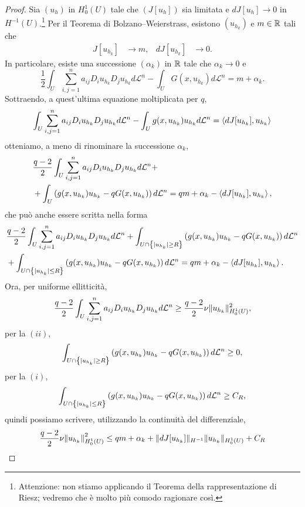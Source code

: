 \begin{proof}
Sia $(u_h)$ in $H^1_0(U)$ tale che $(J[u_h])$ sia limitata e $dJ[u_h] \to 0$ in $H^{-1}(U)$.\footnote{Attenzione: non stiamo applicando il Teorema della rappresentazione di Riesz; vedremo che è molto più comodo ragionare così.}
Per il Teorema di Bolzano--Weierstrass, esistono $(u_{h_k})$ e $m \in \mathbb{R}$ tali che 
\begin{align*}
	J[u_{h_k}] &\to m, & dJ[u_{h_k}] &\to 0.
\end{align*}
In particolare, esiste una successione $(\alpha_k)$ in $\mathbb{R}$ tale che $\alpha_k \to 0$ e
\[ \frac{1}{2} \int_U \sum_{i,j=1}^{n} a_{ij}D_iu_{h_k}D_ju_{h_k}d\mathcal{L}^n-\int_U G(x,u_{h_k}) d\mathcal{L}^n = m + \alpha_k.\]
Sottraendo, a quest'ultima equazione moltiplicata per $q$, 
\[ \int_U \sum_{i,j=1}^{n}a_{ij}D_iu_{h_k}D_ju_{h_k} d\mathcal{L}^n - \int_U g(x,u_{h_k})u_{h_k}d\mathcal{L}^n = \braket{dJ[u_{h_k}],u_{h_k}} \]
otteniamo, a meno di rinominare la successione $\alpha_k$,
\begin{align*}
	&\frac{q-2}{2} \int_U \sum_{i,j=1}^{n} a_{ij}D_i u_{h_k} D_j u_{h_k} d\mathcal{L}^n + \\
	&+ \int_U \left( g(x,u_{h_k})u_{h_k}-qG(x,u_{h_k})\right) d\mathcal{L}^n = qm + \alpha_k - \braket{dJ[u_{h_k}],u_{h_k}}, 
\end{align*}
che può anche essere scritta nella forma
\begin{align*}
	&\frac{q-2}{2} \int_U \sum_{i,j=1}^{n} a_{ij}D_i u_{h_k} D_j u_{h_k} d\mathcal{L}^n + \int_{U \cap \left\lbrace \lvert u_{h_k}\rvert\ge R\right\rbrace}  \left( g(x,u_{h_k})u_{h_k}-qG(x,u_{h_k})\right) d\mathcal{L}^n\\
	&+ \int_{U \cap \left\lbrace \lvert u_{h_k}\rvert\le R\right\rbrace } \left( g(x,u_{h_k})u_{h_k}-qG(x,u_{h_k})\right) d\mathcal{L}^n = qm + \alpha_k - \braket{dJ[u_{h_k}],u_{h_k}}. 
\end{align*}
Ora, per uniforme ellitticità,
\[ \frac{q-2}{2} \int_U \sum_{i,j=1}^{n} a_{ij}D_i u_{h_k} D_j u_{h_k} d\mathcal{L}^n  \ge  \frac{q-2}{2} \nu \lVert u_{h_k}\rVert^2_{H^1_0(U)}, \]
per la $(ii)$,
\[ \int_{U \cap \left\lbrace \lvert u_{h_k}\rvert\ge R\right\rbrace}  \left( g(x,u_{h_k})u_{h_k}-qG(x,u_{h_k})\right) d\mathcal{L}^n \ge 0, \]
per la $(i)$,
\[ \int_{U \cap \left\lbrace \lvert u_{h_k}\rvert\le R\right\rbrace } \left( g(x,u_{h_k})u_{h_k}-qG(x,u_{h_k})\right) d\mathcal{L}^n \ge C_R, \]
quindi possiamo scrivere, utilizzando la continuità del differenziale,
\[  \frac{q-2}{2} \nu \norm*{u_{h_k}}^2_{H^1_0(U)} \le qm +\alpha_k + \norm{dJ[u_{h_k}]}_{H^{-1}}\norm{u_{h_k}}_{H^1_0(U)} + C_R \]

\end{proof}
